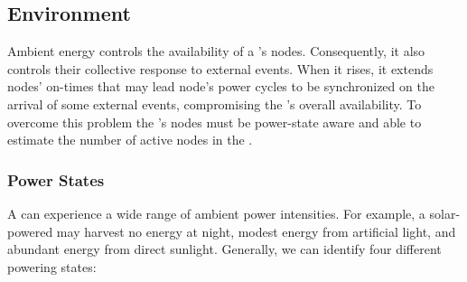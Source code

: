 \subsection{Environment}
Ambient energy controls the availability of a \cis's nodes.  Consequently, it also controls their collective response to external events. When it rises, it extends nodes' on-times that may lead node's power cycles to be synchronized on the arrival of some external events, compromising the \cis's overall availability. To overcome this problem the \cis's nodes must be power-state aware and able to estimate the number of active nodes in the \cis.
%
\subsubsection{Power States}
\label{sec:power_state}
A \cis can experience a wide range of ambient power intensities. For example, a solar-powered \cis may harvest no energy at night, modest energy from artificial light, and abundant energy from direct sunlight.  Generally, we can identify four different \cis powering states: 
